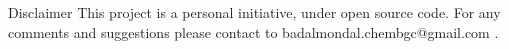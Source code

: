 

\begin{frame}{Disclaimer}
This project is a personal initiative, under open source code. For any comments and suggestions please contact to badalmondal.chembgc@gmail.com .
\end{frame}
